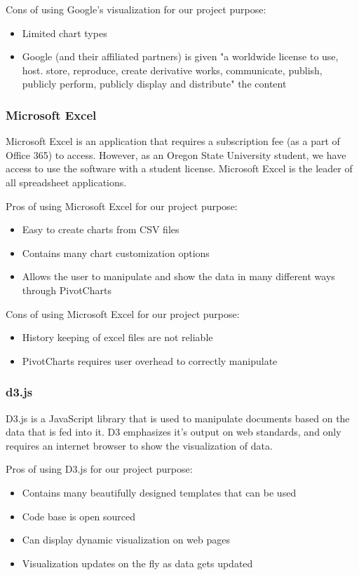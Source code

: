 \documentclass[10pt,journal,compsoc,draftclsnofoot]{IEEEtran}
\begin{document}
Cons of using Google's visualization for our project purpose:
\begin{itemize}
\item Limited chart types
\item Google (and their affiliated partners) is given "a worldwide license to use, host. store, reproduce, create derivative works, communicate, publish, publicly perform, publicly display and distribute" the content \cite{google}
\end{itemize}

\subsubsection{Microsoft Excel}
Microsoft Excel is an application that requires a subscription fee (as a part of Office 365) to access.
However, as an Oregon State University student, we have access to use the software with a student license.
Microsoft Excel is the leader of all spreadsheet applications.

Pros of using Microsoft Excel for our project purpose:
\begin{itemize}
\item Easy to create charts from CSV files
\item Contains many chart customization options
\item Allows the user to manipulate and show the data in many different ways through PivotCharts
\end{itemize}

Cons of using Microsoft Excel for our project purpose:
\begin{itemize}
\item History keeping of excel files are not reliable
\item PivotCharts requires user overhead to correctly manipulate
\end{itemize}

\subsubsection{d3.js}
D3.js is a JavaScript library that is used to manipulate documents based on the data that is fed into it.
D3 emphasizes it's output on web standards, and only requires an internet browser to show the visualization of data.

Pros of using D3.js for our project purpose:
\begin{itemize}
\item Contains many beautifully designed templates that can be used
\item Code base is open sourced
\item Can display dynamic visualization on web pages
\item Visualization updates on the fly as data gets updated
\end{itemize}
\end{document}
